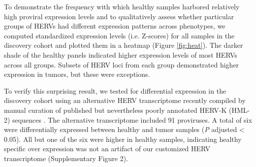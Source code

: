 To demonstrate the frequency with which healthy samples harbored relatively high proviral expression levels and to qualitatively assess whether particular groups of HERVs had different expression patterns across phenotypes, we computed standardized expression levels (i.e. Z-scores) for all samples in the discovery cohort and plotted them in a heatmap (Figure \ref{fig:heat}).
The darker shade of the healthy panels indicated higher expression levels of most HERVs across all groups.
Subsets of HERV loci from each group demonstrated higher expression in tumors, but these were exceptions.

To verify this surprising result, we tested for differential expression in the discovery cohort using an alternative HERV transcriptome recently compiled by manual curation of published but nevertheless poorly annotated HERV-K (HML-2) sequences \citep{Grabski2020}.
The alternative transcriptome included 91 proviruses.
A total of six were differentially expressed between healthy and tumor samples (\emph{P} adjusted < 0.05).
All but one of the six were higher in healthy samples, indicating healthy specific over expression was not an artifact of our customized HERV transcriptome (Supplementary Figure 2).
